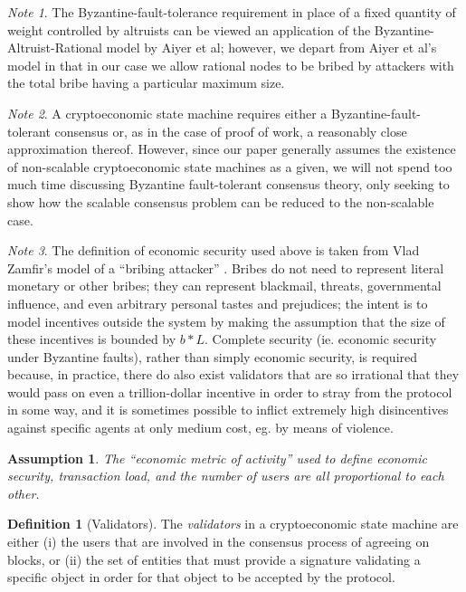 \documentclass[11pt,a4paper]{report}
\theoremstyle{plain}
\newtheorem{assm}{Assumption}[chapter]
\theoremstyle{definition}
\newtheorem{defn}{Definition}[chapter]
\theoremstyle{remark}
\newtheorem*{note}{Note}
\begin{document}
\begin{note}
The Byzantine-fault-tolerance requirement in place of a fixed quantity of weight controlled by altruists can be viewed an application of the Byzantine-Altruist-Rational model by Aiyer et al\cite{bar}; however, we depart from Aiyer et al's model in that in our case we allow rational nodes to be bribed by attackers with the total bribe having a particular maximum size.
\end{note}

\begin{note}
A cryptoeconomic state machine requires either a Byzantine-fault-tolerant consensus or, as in the case of proof of work\cite{amiller}, a reasonably close approximation thereof. However, since our paper generally assumes the existence of non-scalable cryptoeconomic state machines as a given, we will not spend too much time discussing Byzantine fault-tolerant consensus theory, only seeking to show how the scalable consensus problem can be reduced to the non-scalable case.
\end{note}

\begin{note}
The definition of economic security used above is taken from Vlad Zamfir's model of a ``bribing attacker'' \cite{zamfir}. Bribes do not need to represent literal monetary or other bribes; they can represent blackmail, threats, governmental influence, and even arbitrary personal tastes and prejudices; the intent is to model incentives outside the system by making the assumption that the size of these incentives is bounded by $b * L$. Complete security (ie. economic security under Byzantine faults), rather than simply economic security, is required because, in practice, there do also exist validators that are so irrational that they would pass on even a trillion-dollar incentive in order to stray from the protocol in some way, and it is sometimes possible to inflict extremely high disincentives against specific agents at only medium cost, eg. by means of violence.
\end{note}

\begin{assm}
The ``economic metric of activity'' used to define economic security, transaction load, and the number of users are all proportional to each other.
\end{assm}

\begin{defn}[Validators]
The \emph{validators} in a cryptoeconomic state machine are either (i) the users that are involved in the consensus process of agreeing on blocks, or (ii) the set of entities that must provide a signature validating a specific object in order for that object to be accepted by the protocol.
\end{defn}
\end{document}
